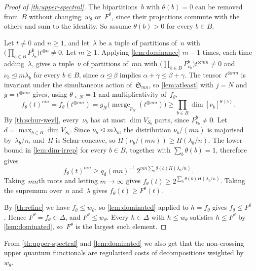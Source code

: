 \documentclass[11pt,letterpaper]{article}
\DeclareMathOperator{\merge}{merge}
\begin{document}
\begin{proof}[Proof of \cref{th:upper-spectral}]
The bipartitions~$b$ with $\theta(b) = 0$ can be removed from~$B$ without changing~$w_\theta$ or~$F^\theta$, since their projections commute with the others and sum to the identity. So assume $\theta(b) > 0$ for every $b \in B$.

Let $t \neq 0$ and $n \geq 1$, and let~$\lambda$ be a tuple of partitions of~$n$ with $\bigl( \prod_{b \in B} P^b_{\lambda_b} \bigr) t^{\otimes n} \neq 0$. Let $m \geq 1$. Applying \cref{lem:dominance} $m - 1$ times, each time adding~$\lambda$, gives a tuple~$\nu$ of partitions of~$mn$ with $\bigl( \prod_{b \in B} P^b_{\nu_b} \bigr) t^{\otimes mn} \neq 0$ and $\nu_b \unlhd m\lambda_b$ for every $b \in B$, since $\alpha \unlhd \beta$ implies $\alpha + \gamma \unlhd \beta + \gamma$. The tensor~$t^{\otimes mn}$ is invariant under the simultaneous action of~$\mathfrak{S}_{mn}$, so \cref{lem:atleast} with $j = N$ and $y = t^{\otimes mn}$ gives, using $\theta_{\leq N} = 1$ and multiplicativity of~$f_\theta$,
\[
f_\theta(t)^{mn} = f_\theta(t^{\otimes mn}) = g_N\bigl( \merge_{p_N}(t^{\otimes mn}) \bigr) \geq \prod_{b \in B} \dim[\nu_b]^{\theta(b)}.
\]
By \cref{th:schur-weyl}, every~$\nu_b$ has at most $\dim V_{S_b}$ parts, since $P^b_{\nu_b} \neq 0$. Let $d = \max_{b \in B} \dim V_{S_b}$. Since $\nu_b \unlhd m\lambda_b$, the distribution $\nu_b/(mn)$ is majorised by~$\lambda_b/n$, and~$H$ is Schur-concave, so $H(\nu_b/(mn)) \geq H(\lambda_b/n)$. The lower bound in \cref{lem:dim-irrep} for every $b \in B$, together with $\sum_b \theta(b) = 1$, therefore gives
\[
f_\theta(t)^{mn} \geq q_d(mn)^{-1}\, 2^{mn \sum_b \theta(b) H(\lambda_b/n)}.
\]
Taking~$mn$th roots and letting $m \to \infty$ gives $f_\theta(t) \geq 2^{\sum_b \theta(b) H(\lambda_b/n)}$. Taking the supremum over~$n$ and~$\lambda$ gives $f_\theta(t) \geq F^\theta(t)$.

By \cref{th:refine} we have $f_\theta \leq w_\theta$, so \cref{lem:dominated} applied to $h = f_\theta$ gives $f_\theta \leq F^\theta$. Hence $F^\theta = f_\theta \in \Delta$, and $F^\theta \leq w_\theta$. Every $h \in \Delta$ with $h \leq w_\theta$ satisfies $h \leq F^\theta$ by \cref{lem:dominated}, so~$F^\theta$ is the largest such element.
\end{proof}

From \cref{th:upper-spectral} and \cref{lem:dominated} we also get that the non-crossing upper quantum functionals are regularised costs of decompositions weighted by~$w_\theta$.
\end{document}

